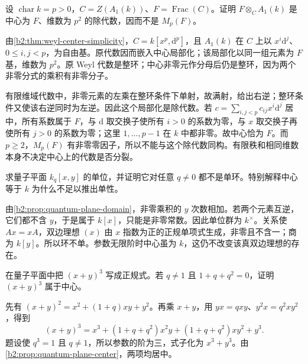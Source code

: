 \begin{optionalexercise}\label{b2:ex:20-weyl-center-module-rank}
	设 \(\operatorname{char}k=p>0\)，\(C=Z(A_1(k))\)、\(F=\operatorname{Frac}(C)\)。证明 \(F\otimes_CA_1(k)\) 是中心为 \(F\)、维数为 \(p^2\) 的除代数，因而不是 \(M_p(F)\)。
\end{optionalexercise}
\begin{solution}
	由\cref{b2:thm:weyl-center-simplicity}，\(C=k[x^p,\mathrm d^p]\)，且 \(A_1(k)\) 在 \(C\) 上以 \(x^i\mathrm d^j\)、\(0\le i,j<p\)，为自由基。原代数因而嵌入中心局部化；该局部化以同一组元素为 \(F\) 基，维数为 \(p^2\)。原 Weyl 代数是整环；中心非零元作分母后仍是整环，因为两个非零分式的乘积有非零分子。

	有限维域代数中，非零元素的左乘在整环条件下单射，故满射，给出右逆；整环条件又使该右逆同时为左逆。因此这个局部化是除代数。若 \(c=\sum_{i,j<p}c_{ij}x^i\mathrm d^j\) 居中，所有系数属于 \(F\)，与 \(\mathrm d\) 取交换子使所有 \(i>0\) 的系数为零，与 \(x\) 取交换子再使所有 \(j>0\) 的系数为零；这里 \(1,\ldots,p-1\) 在 \(k\) 中都非零。故中心恰为 \(F\)。而 \(p\ge2\)，\(M_p(F)\) 有非零零因子，所以不能与这个除代数同构。有限秩和相同维数本身不决定中心上的代数是否分裂。
\end{solution}

\begin{optionalexercise}\label{b2:ex:20-quantum-units-ideals}
	求量子平面 \(k_q[x,y]\) 的单位，并证明它对任意 \(q\ne0\) 都不是单环。特别解释中心等于 \(k\) 为什么不足以推出单性。
\end{optionalexercise}
\begin{solution}
	由\cref{b2:prop:quantum-plane-domain}，非零乘积的 \(y\) 次数相加。若两个元素互逆，它们都不含 \(y\)，于是属于 \(k[x]\)，只能是非零常数。因此单位群为 \(k^\times\)。关系使 \(Ax=xA\)，双边理想 \((x)\) 由 \(x\) 指数为正的正规单项式生成，非零且不含一；商为 \(k[y]\)。所以环不单。参数无限阶时中心虽为 \(k\)，这仍不改变该真双边理想的存在。
\end{solution}

\begin{optionalexercise}\label{b2:ex:20-quantum-binomial}
	在量子平面中把 \((x+y)^3\) 写成正规式。若 \(q\ne1\) 且 \(1+q+q^2=0\)，证明 \((x+y)^3\) 属于中心。
\end{optionalexercise}
\begin{solution}
	先有 \((x+y)^2=x^2+(1+q)xy+y^2\)。再乘 \(x+y\)，用 \(yx=qxy\)、\(y^2x=q^2xy^2\)，得到
	\[
		(x+y)^3=x^3+(1+q+q^2)x^2y+(1+q+q^2)xy^2+y^3.
	\]
	题设使 \(q^3=1\) 且 \(q\ne1\)，所以参数的阶为三，式子化为 \(x^3+y^3\)。由\cref{b2:prop:quantum-plane-center}，两项均居中。
\end{solution}


